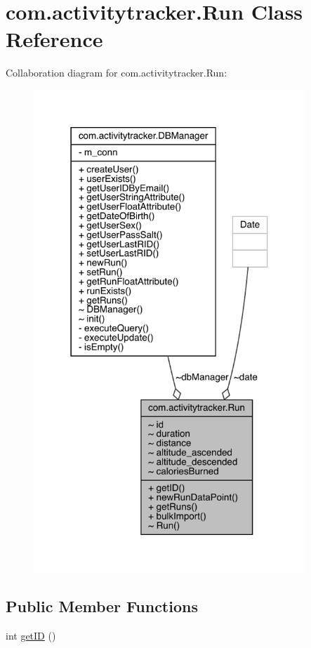 \hypertarget{classcom_1_1activitytracker_1_1_run}{}\section{com.\+activitytracker.\+Run Class Reference}
\label{classcom_1_1activitytracker_1_1_run}


Collaboration diagram for com.\+activitytracker.\+Run\+:
\nopagebreak
\begin{figure}[H]
\begin{center}
\leavevmode
\includegraphics[width=290pt]{classcom_1_1activitytracker_1_1_run__coll__graph}
\end{center}
\end{figure}
\subsection*{Public Member Functions}
\begin{DoxyCompactItemize}
\item 
int \mbox{\hyperlink{classcom_1_1activitytracker_1_1_run_a61916c14ab5a2bf6b080200f7d0c5566}{get\+ID}} ()
\end{DoxyCompactItemize}
